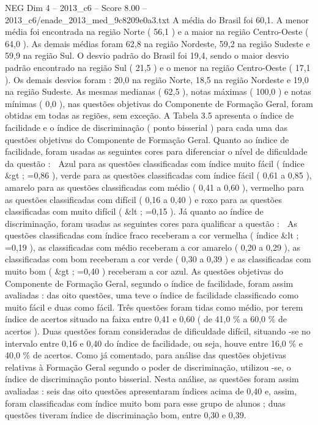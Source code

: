 \begin{textsample}{NEG Dim 4 – 2013\_c6 – Score 8.00 – 2013\_c6/enade\_2013\_med\_9c8209e0a3.txt}
A média do Brasil foi 60,1.
A menor média foi encontrada na região Norte ( 56,1 ) e a maior na região Centro-Oeste ( 64,0 ).
As demais médias foram 62,8 na região Nordeste, 59,2 na região Sudeste e 59,9 na região Sul.
O desvio padrão do Brasil foi 19,4, sendo o maior desvio padrão encontrado na região Sul ( 21,5 ) e o menor na região Centro-Oeste ( 17,1 ).
Os demais desvios foram : 20,0 na região Norte, 18,5 na região Nordeste e 19,0 na região Sudeste.
As mesmas medianas ( 62,5 ), notas máximas ( 100,0 ) e notas mínimas ( 0,0 ), nas questões objetivas do Componente de Formação Geral, foram obtidas em todas as regiões, sem exceção.
A Tabela 3.5 apresenta o índice de facilidade e o índice de discriminação ( ponto bisserial ) para cada uma das questões objetivas do Componente de Formação Geral.
Quanto ao índice de facilidade, foram usadas as seguintes cores para diferenciar o nível de dificuldade da questão :  Azul para as questões classificadas com índice muito fácil ( índice \&gt ; =0,86 ), verde para as questões classificadas com índice fácil ( 0,61 a 0,85 ), amarelo para as questões classificadas com médio ( 0,41 a 0,60 ), vermelho para as questões classificadas com difícil ( 0,16 a 0,40 ) e roxo para as questões classificadas com muito difícil ( \&lt ; =0,15 ).
Já quanto ao índice de discriminação, foram usadas as seguintes cores para qualificar a questão :  As questões classificadas com índice fraco receberam a cor vermelha ( índice \&lt ; =0,19 ), as classificadas com médio receberam a cor amarelo ( 0,20 a 0,29 ), as classificadas com bom receberam a cor verde ( 0,30 a 0,39 ) e as classificadas com muito bom ( \&gt ; =0,40 ) receberam a cor azul.
As questões objetivas do Componente de Formação Geral, segundo o índice de facilidade, foram assim avaliadas : das oito questões, uma teve o índice de facilidade classificado como muito fácil e duas como fácil.
Três questões foram tidas como médio, por terem índice de acertos situado na faixa entre 0,41 e 0,60 ( de 41,0 \% a 60,0 \% de acertos ).
Duas questões foram consideradas de dificuldade difícil, situando -se no intervalo entre 0,16 e 0,40 do índice de facilidade, ou seja, houve entre 16,0 \% e 40,0 \% de acertos.
Como já comentado, para análise das questões objetivas relativas à Formação Geral segundo o poder de discriminação, utilizou -se, o índice de discriminação ponto bisserial.
Nesta análise, as questões foram assim avaliadas : seis das oito questões apresentaram índices acima de 0,40 e, assim, foram classificadas com índice muito bom para esse grupo de alunos ; duas questões tiveram índice de discriminação bom, entre 0,30 e 0,39.

\end{textsample}
